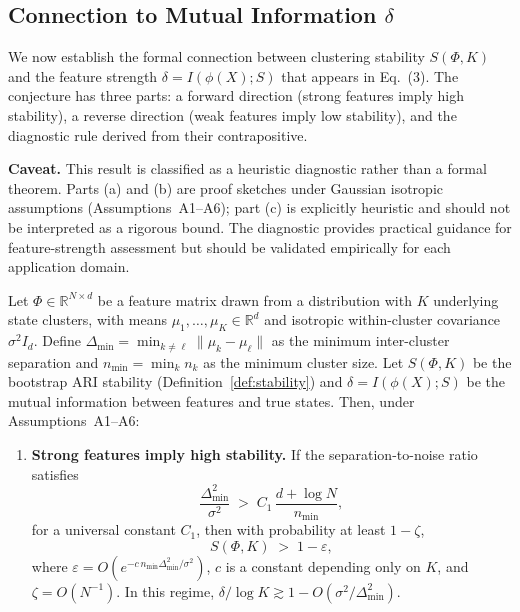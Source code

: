 \subsection{Connection to Mutual Information $\delta$}

We now establish the formal connection between clustering stability $S(\Phi, K)$ and the feature strength $\delta = I(\phi(X); S)$ that appears in Eq.~(3). The conjecture has three parts: a forward direction (strong features imply high stability), a reverse direction (weak features imply low stability), and the diagnostic rule derived from their contrapositive.

\begin{conjecture}
\label{prop:bootstrap_ari}

\textbf{Caveat.} This result is classified as a heuristic diagnostic rather than a formal theorem. Parts (a) and (b) are proof sketches under Gaussian isotropic assumptions (Assumptions~A1--A6); part (c) is explicitly heuristic and should not be interpreted as a rigorous bound. The diagnostic provides practical guidance for feature-strength assessment but should be validated empirically for each application domain.

Let $\Phi \in \mathbb{R}^{N \times d}$ be a feature matrix drawn from a distribution with $K$ underlying state clusters, with means $\mu_1, \dots, \mu_K \in \mathbb{R}^d$ and isotropic within-cluster covariance $\sigma^2 I_d$. Define $\Delta_{\min} = \min_{k \neq \ell} \|\mu_k - \mu_\ell\|$ as the minimum inter-cluster separation and $n_{\min} = \min_k n_k$ as the minimum cluster size. Let $S(\Phi, K)$ be the bootstrap ARI stability (Definition~\ref{def:stability}) and $\delta = I(\phi(X); S)$ be the mutual information between features and true states. Then, under Assumptions~A1--A6:

\begin{enumerate}
    \item[(a)] \textbf{Strong features imply high stability.} If the separation-to-noise ratio satisfies
    \[
    \frac{\Delta_{\min}^2}{\sigma^2} \;>\; C_1\,\frac{d + \log N}{n_{\min}},
    \]
    for a universal constant $C_1$, then with probability at least $1 - \zeta$,
    \[
    S(\Phi, K) \;>\; 1 - \varepsilon,
    \]
    where $\varepsilon = O\!\left(e^{-c\, n_{\min} \Delta_{\min}^2 / \sigma^2}\right)$, $c$ is a constant depending only on $K$, and $\zeta = O(N^{-1})$. In this regime, $\delta / \log K \gtrsim 1 - O(\sigma^2 / \Delta_{\min}^2)$.


\end{enumerate}
\end{conjecture}

